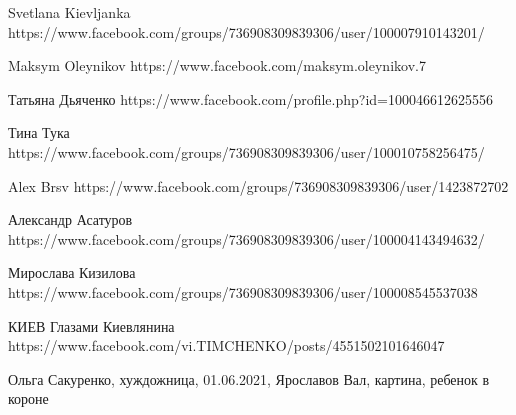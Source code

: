  
 
 
 
 
Svetlana Kievljanka
https://www.facebook.com/groups/736908309839306/user/100007910143201/

Maksym Oleynikov
https://www.facebook.com/maksym.oleynikov.7

Татьяна Дьяченко
https://www.facebook.com/profile.php?id=100046612625556

Тина Тука
https://www.facebook.com/groups/736908309839306/user/100010758256475/

Alex Brsv
https://www.facebook.com/groups/736908309839306/user/1423872702

Александр Асатуров
https://www.facebook.com/groups/736908309839306/user/100004143494632/

Мирослава Кизилова
https://www.facebook.com/groups/736908309839306/user/100008545537038

КИЕВ Глазами Киевлянина
https://www.facebook.com/vi.TIMCHENKO/posts/4551502101646047

Ольга Сакуренко, хуждожница, 01.06.2021, Ярославов Вал, картина, ребенок в короне
